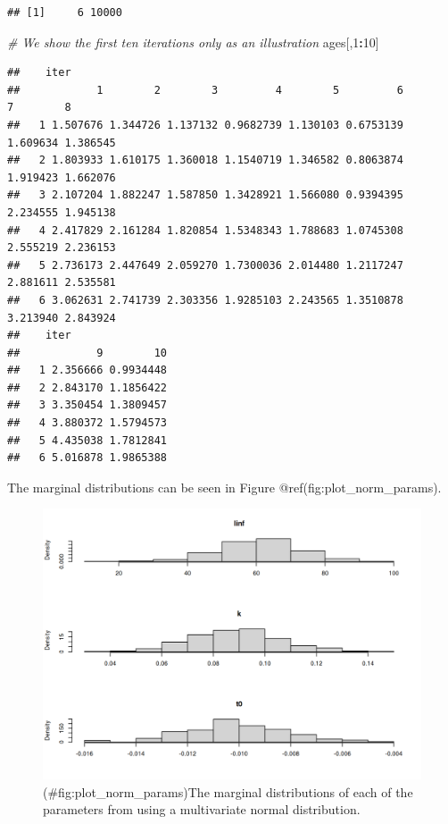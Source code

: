 \documentclass[
]{book}
\newenvironment{Shaded}{\begin{snugshade}}{\end{snugshade}}
\newcommand{\CommentTok}[1]{\textcolor[rgb]{0.56,0.35,0.01}{\textit{#1}}}
\newcommand{\DecValTok}[1]{\textcolor[rgb]{0.00,0.00,0.81}{#1}}
\newcommand{\NormalTok}[1]{#1}
\newcommand{\SpecialCharTok}[1]{\textcolor[rgb]{0.81,0.36,0.00}{\textbf{#1}}}
\begin{document}
\begin{verbatim}
## [1]     6 10000
\end{verbatim}

\begin{Shaded}
\begin{Highlighting}[]
\CommentTok{\# We show the first ten iterations only as an illustration}
\NormalTok{ages[,}\DecValTok{1}\SpecialCharTok{:}\DecValTok{10}\NormalTok{]}
\end{Highlighting}
\end{Shaded}

\begin{verbatim}
##    iter
##            1        2        3         4        5         6        7        8
##   1 1.507676 1.344726 1.137132 0.9682739 1.130103 0.6753139 1.609634 1.386545
##   2 1.803933 1.610175 1.360018 1.1540719 1.346582 0.8063874 1.919423 1.662076
##   3 2.107204 1.882247 1.587850 1.3428921 1.566080 0.9394395 2.234555 1.945138
##   4 2.417829 2.161284 1.820854 1.5348343 1.788683 1.0745308 2.555219 2.236153
##   5 2.736173 2.447649 2.059270 1.7300036 2.014480 1.2117247 2.881611 2.535581
##   6 3.062631 2.741739 2.303356 1.9285103 2.243565 1.3510878 3.213940 2.843924
##    iter
##            9        10
##   1 2.356666 0.9934448
##   2 2.843170 1.1856422
##   3 3.350454 1.3809457
##   4 3.880372 1.5794573
##   5 4.435038 1.7812841
##   6 5.016878 1.9865388
\end{verbatim}

The marginal distributions can be seen in Figure @ref(fig:plot\_norm\_params).

\begin{figure}
\centering
\includegraphics{_bookdown_files/_main_files/figure-html/plot_norm_params-1.png}
\caption{(\#fig:plot\_norm\_params)The marginal distributions of each of the parameters from using a multivariate normal distribution.}
\end{figure}
\end{document}
